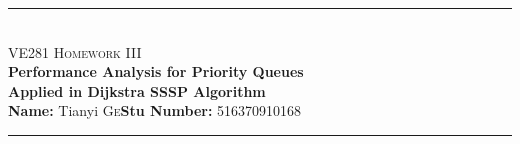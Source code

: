 \newcommand{\HRule}{\rule{\linewidth}{0.5mm}}
{
\center

\HRule \\[0.4cm]
\textsc{\huge VE281 Homework III}\\[0.4cm]
{\Large\textbf{Performance Analysis for Priority Queues}}\\[0.4cm]
{\Large\textbf{Applied in Dijkstra SSSP Algorithm}}\\[0.4cm]
{\large \textbf{Name:} Tianyi  \textsc{Ge}\quad \textbf{Stu Number:} 516370910168}\\[0.2cm]
\HRule \\[1.5cm]
}